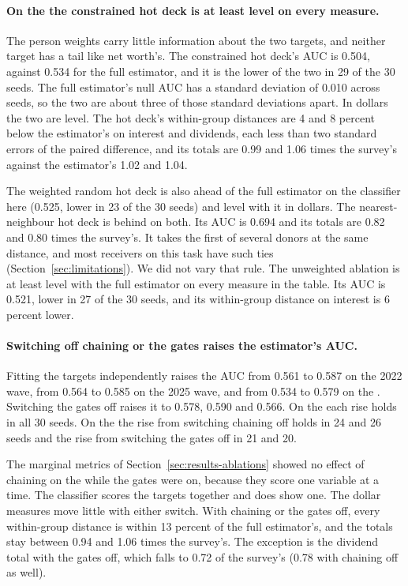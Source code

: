 \paragraph{On the \cps{} the constrained hot deck is at least level on every
measure.} The \cps{} person weights carry little information about the two
targets, and neither target has a tail like net worth's. The constrained hot
deck's AUC is 0.504, against 0.534 for the full estimator, and it is the
lower of the two in 29 of the 30 seeds. The full estimator's null AUC has a
standard deviation of 0.010 across seeds, so the two are about three of
those standard deviations apart. In dollars the two are level. The hot
deck's within-group distances are 4 and 8 percent below the estimator's on
interest and dividends, each less than two standard errors of the paired
difference, and its totals are 0.99 and 1.06 times the survey's against the
estimator's 1.02 and 1.04.

The weighted random hot deck is also ahead of the full estimator on the
classifier here (0.525, lower in 23 of the 30 seeds) and level with it in
dollars. The nearest-neighbour hot deck is behind on both. Its AUC is 0.694
and its totals are 0.82 and 0.80 times the survey's. It takes the first of
several donors at the same distance, and most receivers on this task have
such ties (Section~\ref{sec:limitations}). We did not vary that rule. The unweighted ablation
is at least level with the full estimator on every measure in the table.
Its AUC is 0.521, lower in 27 of the 30 seeds, and its within-group distance
on interest is 6 percent lower.

\paragraph{Switching off chaining or the gates raises the estimator's AUC.}
Fitting the targets independently raises the AUC from 0.561 to 0.587 on the
2022 wave, from 0.564 to 0.585 on the 2025 wave, and from 0.534 to 0.579 on
the \cps{}. Switching the gates off raises it to 0.578, 0.590 and 0.566. On
the \cps{} each rise holds in all 30 seeds. On the \scf{} the rise from
switching chaining off holds in 24 and 26 seeds and the rise from switching
the gates off in 21 and 20.

The marginal metrics of Section~\ref{sec:results-ablations} showed no effect
of chaining on the \cps{} while the gates were on, because they score one
variable at a time. The classifier scores the targets together and does show
one. The dollar measures move little with either switch. With chaining or
the gates off, every within-group distance is within 13 percent of the full
estimator's, and the totals stay between 0.94 and 1.06 times the survey's.
The exception is the dividend total with the gates off, which falls to 0.72
of the survey's (0.78 with chaining off as well).

